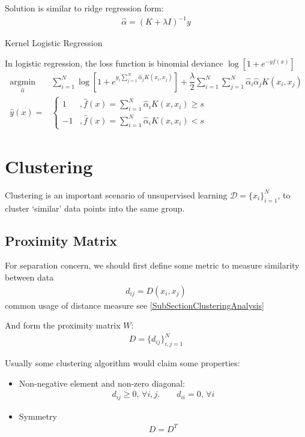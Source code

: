      Solution is similar to ridge regression form:
     \begin{align}
        \hat{\alpha }=(K+\lambda I)^{-1}y 
     \end{align}     

\begin{point}
    Kernel Logistic Regression
\end{point}

    In logistic regression, the loss function is binomial deviance $ \log\left[1+e^{-yf(x)}\right] $
    \begin{align}
        \mathop{\arg\min}\limits_{\hat{\alpha } }&\sum_{i=1}^N\log \left[1+e^{y_i\sum_{j=1}^N\hat{\alpha }_jK(x_i,x_j)}\right]+\dfrac{\lambda }{2}\sum_{i=1}^N\sum_{j=1}^N  \hat{\alpha }_i\hat{\alpha }_jK(x_i,x_j)\\
        \hat{y}(x)=&\begin{cases}
            1 &,\hat{f}(x)=\sum_{i=1}^N\hat{\alpha }_iK(x,x_i)\geq s\\
            -1&,\hat{f}(x)=\sum_{i=1}^N\hat{\alpha }_iK(x,x_i)<s
        \end{cases}
    \end{align}
    

\section{Clustering}\label{SubSectionStatLearningClustering}
    Clustering is an important scenario of unsupervised learning $ \mathcal{D}=\{x_i\}_{i=1}^N $, to cluster `similar' data points into the same group. 

\subsection{Proximity Matrix}
    For separation concern, we should first define some metric to measure similarity between data
    \begin{align}
        d_{ij}=D(x_i,x_j) 
    \end{align}
    common usage of distance measure see \autoref{SubSectionClusteringAnalysis}
    
    And form the proximity matrix $ W $:
    \begin{align}
    D=\{d_{ij}\}_{i,j=1}^N 
    \end{align}
    
    Usually some clustering algorithm would claim some properties:
\begin{itemize}[topsep=2pt,itemsep=0pt]
    \item Non-negative element and non-zero diagonal:
    \begin{align}
        d_{ij}\geq 0,\,\forall i,j.\qquad d_{ii}=0,\,\forall i 
    \end{align}
    \item Symmetry
    \begin{align}
        D=D^T 
    \end{align}
\end{itemize}

